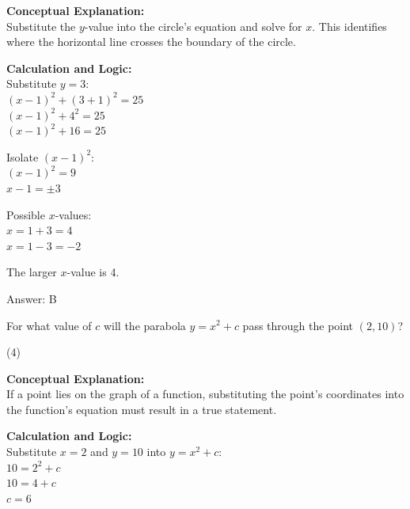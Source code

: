 \documentclass[11pt,paper=a4,answers]{exam}
\begin{document}
\begin{questions}
\begin{solution}
\textbf{Conceptual Explanation:} \\
Substitute the $y$-value into the circle's equation and solve for $x$. This identifies where the horizontal line crosses the boundary of the circle.

\vspace{20pt}

\textbf{Calculation and Logic:} \\
Substitute $y = 3$: \\
$(x - 1)^2 + (3 + 1)^2 = 25$ \\
$(x - 1)^2 + 4^2 = 25$ \\
$(x - 1)^2 + 16 = 25$

\vspace{10pt}

Isolate $(x - 1)^2$: \\
$(x - 1)^2 = 9$ \\
$x - 1 = \pm 3$

\vspace{10pt}

Possible $x$-values: \\
$x = 1 + 3 = 4$ \\
$x = 1 - 3 = -2$

\vspace{10pt}

The larger $x$-value is 4.

\vspace{25pt}

Answer: \colorbox{yellow!100}{B}
\end{solution}

\vspace{40pt}

\question
For what value of $c$ will the parabola $y = x^2 + c$ pass through the point $(2, 10)$?
\begin{tasks}(4)
\end{tasks}

\begin{solution}
\textbf{Conceptual Explanation:} \\
If a point lies on the graph of a function, substituting the point's coordinates into the function's equation must result in a true statement.

\vspace{20pt}

\textbf{Calculation and Logic:} \\
Substitute $x = 2$ and $y = 10$ into $y = x^2 + c$: \\
$10 = 2^2 + c$ \\
$10 = 4 + c$ \\
$c = 6$


\end{solution}
\end{questions}
\end{document}
